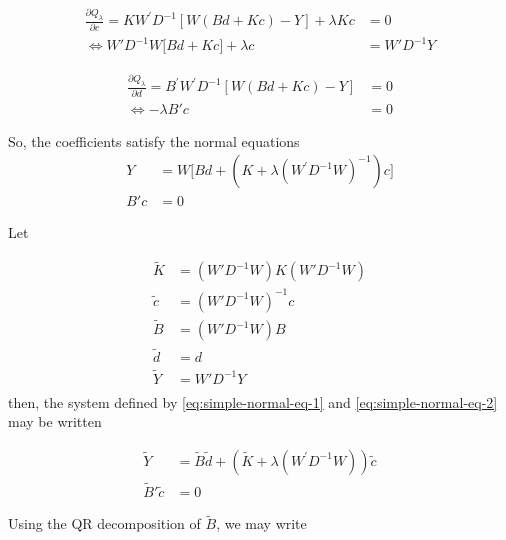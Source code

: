 \documentclass[12pt]{article}
\newcommand{\tildeK}{\tilde{K}}
\newcommand{\tildec}{\tilde{c}}
\newcommand{\tildeB}{\tilde{B}}
\newcommand{\tilded}{\tilde{d}}
\newcommand{\tildeY}{\tilde{Y}}
\theoremstyle{definition}
\begin{document}
\begin{align}
\frac{\partial Q_\lambda}{\partial c} = K W^\prime D^{-1}\left[ W\left(Bd + Kc\right) - Y  \right] + \lambda Kc &= 0 \nonumber \\
\iff    W'D^{-1} W \bigg[ Bd + Kc \bigg] + \lambda c  &= W' D^{-1}Y \label{eq:normal-eq-1}
\end{align}
\noindent

\begin{align*}
\frac{\partial Q_\lambda}{\partial d} = B^\prime W^\prime D^{-1}\left[ W\left(Bd + Kc\right) - Y  \right] &=0 \nonumber \\
\iff   - \lambda B' c  &= 0  
\end{align*}
\bigskip
\noindent

So, the coefficients satisfy the normal equations
\begin{align} 
Y &= W \bigg[ Bd + \left(K  + \lambda \left(W^\prime D^{-1} W \right)^{-1} \right) c \bigg] \label{eq:simple-normal-eq-1} \\
B' c  &= 0  \label{eq:simple-normal-eq-2}
\end{align}
\noindent

Let 

\begin{align*}
\tildeK &= \left(W'D^{-1}W\right) K \left(W'D^{-1}W\right)\\
 \tildec &= \left(W'D^{-1}W\right)^{-1}c\\
\tildeB &= \left(W'D^{-1}W\right)B\\ 
\tilded &= d\\
\tildeY &= W'D^{-1}Y\\
\end{align*}
\bigskip
\noindent
then, the system defined by  \ref{eq:simple-normal-eq-1} and \ref{eq:simple-normal-eq-2} may be written

\begin{align} 
\tildeY &= \tildeB \tilded + \left(\tildeK  + \lambda \left(W^\prime D^{-1} W \right) \right) \tildec \label{eq:transform-normal-eq-1} \\
\tildeB' \tildec  &= 0  \label{eq:transform-normal-eq-2}
\end{align}

Using the QR decomposition of $\tildeB$, we may write 
\end{document}
